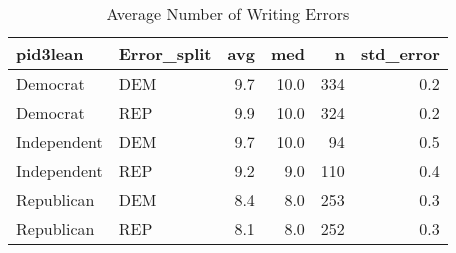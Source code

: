 \begin{table}[!htb]
\centering
\caption{Average Number of Writing Errors} 
\label{tab:error_sum}
\begin{tabular}{llrrrr}
  \hline
pid3lean & Error\_split & avg & med & n & std\_error \\ 
  \hline
Democrat     & DEM & 9.7 & 10.0 & 334 & 0.2 \\ 
  Democrat     & REP & 9.9 & 10.0 & 324 & 0.2 \\ 
  Independent  & DEM & 9.7 & 10.0 & 94 & 0.5 \\ 
  Independent  & REP & 9.2 & 9.0 & 110 & 0.4 \\ 
  Republican   & DEM & 8.4 & 8.0 & 253 & 0.3 \\ 
  Republican   & REP & 8.1 & 8.0 & 252 & 0.3 \\ 
   \hline
\end{tabular}
\end{table}
